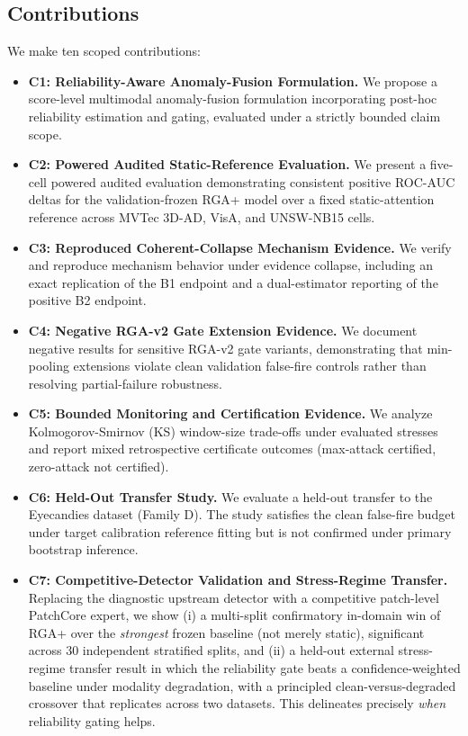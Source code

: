\documentclass[10pt,conference]{IEEEtran}
\begin{document}
\subsection{Contributions}
We make ten scoped contributions:
\begin{itemize}
  \item \textbf{C1: Reliability-Aware Anomaly-Fusion Formulation.} We propose a score-level multimodal anomaly-fusion formulation incorporating post-hoc reliability estimation and gating, evaluated under a strictly bounded claim scope.
  \item \textbf{C2: Powered Audited Static-Reference Evaluation.} We present a five-cell powered audited evaluation demonstrating consistent positive ROC-AUC deltas for the validation-frozen RGA+ model over a fixed static-attention reference across MVTec 3D-AD, VisA, and UNSW-NB15 cells.
  \item \textbf{C3: Reproduced Coherent-Collapse Mechanism Evidence.} We verify and reproduce mechanism behavior under evidence collapse, including an exact replication of the B1 endpoint and a dual-estimator reporting of the positive B2 endpoint.
  \item \textbf{C4: Negative RGA-v2 Gate Extension Evidence.} We document negative results for sensitive RGA-v2 gate variants, demonstrating that min-pooling extensions violate clean validation false-fire controls rather than resolving partial-failure robustness.
  \item \textbf{C5: Bounded Monitoring and Certification Evidence.} We analyze Kolmogorov-Smirnov (KS) window-size trade-offs under evaluated stresses and report mixed retrospective certificate outcomes (max-attack certified, zero-attack not certified).
  \item \textbf{C6: Held-Out Transfer Study.} We evaluate a held-out transfer to the Eyecandies dataset (Family D). The study satisfies the clean false-fire budget under target calibration reference fitting but is not confirmed under primary bootstrap inference.
  \item \textbf{C7: Competitive-Detector Validation and Stress-Regime Transfer.} Replacing the diagnostic upstream detector with a competitive patch-level PatchCore expert, we show (i) a multi-split confirmatory in-domain win of RGA+ over the \emph{strongest} frozen baseline (not merely static), significant across $30$ independent stratified splits, and (ii) a held-out external stress-regime transfer result in which the reliability gate beats a confidence-weighted baseline under modality degradation, with a principled clean-versus-degraded crossover that replicates across two datasets. This delineates precisely \emph{when} reliability gating helps.

\end{itemize}
\end{document}
